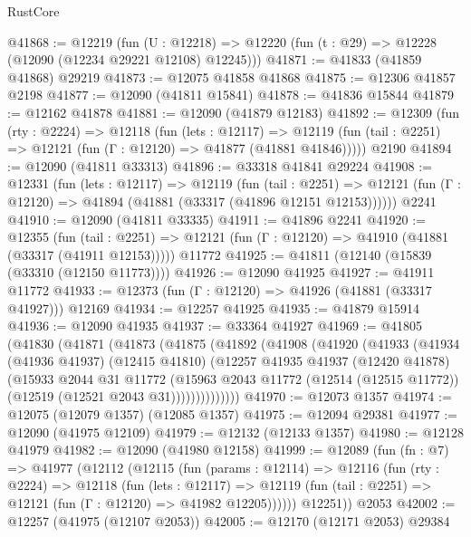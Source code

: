 \begin{lexlean}{RustCore}
\begin{coremodule}
@41868 := @12219
    (fun (U : @12218) => @12220 (fun (t : @29) => @12228 (@12090 (@12234 @29221 @12108) @12245)))
@41871 := @41833 (@41859 @41868) @29219
@41873 := @12075 @41858 @41868
@41875 := @12306 @41857 @2198
@41877 := @12090 (@41811 @15841)
@41878 := @41836 @15844
@41879 := @12162 @41878
@41881 := @12090 (@41879 @12183)
@41892 := @12309
    (fun (rty : @2224) =>
    @12118
      (fun (lets : @12117) =>
      @12119 (fun (tail : @2251) => @12121 (fun (Γ : @12120) => @41877 (@41881 @41846)))))
    @2190
@41894 := @12090 (@41811 @33313)
@41896 := @33318 @41841 @29224
@41908 := @12331
    (fun (lets : @12117) =>
    @12119
      (fun (tail : @2251) =>
      @12121 (fun (Γ : @12120) => @41894 (@41881 (@33317 (@41896 @12151 @12153))))))
    @2241
@41910 := @12090 (@41811 @33335)
@41911 := @41896 @2241
@41920 := @12355
    (fun (tail : @2251) => @12121 (fun (Γ : @12120) => @41910 (@41881 (@33317 (@41911 @12153)))))
    @11772
@41925 := @41811 (@12140 (@15839 (@33310 (@12150 @11773))))
@41926 := @12090 @41925
@41927 := @41911 @11772
@41933 := @12373 (fun (Γ : @12120) => @41926 (@41881 (@33317 @41927))) @12169
@41934 := @12257 @41925
@41935 := @41879 @15914
@41936 := @12090 @41935
@41937 := @33364 @41927
@41969 := @41805
    (@41830
      (@41871
        (@41873
          (@41875
            (@41892
              (@41908
                (@41920
                  (@41933
                    (@41934
                      (@41936 @41937)
                      (@12415 @41810)
                      (@12257
                        @41935
                        @41937
                        (@12420 @41878)
                        (@15933
                          @2044
                          @31
                          @11772
                          (@15963
                            @2043
                            @11772
                            (@12514 (@12515 @11772))
                            (@12519 (@12521 @2043 @31))))))))))))))
@41970 := @12073 @1357
@41974 := @12075 (@12079 @1357) (@12085 @1357)
@41975 := @12094 @29381
@41977 := @12090 (@41975 @12109)
@41979 := @12132 (@12133 @1357)
@41980 := @12128 @41979
@41982 := @12090 (@41980 @12158)
@41999 := @12089
    (fun (fn : @7) =>
    @41977
      (@12112
        (@12115
          (fun (params : @12114) =>
          @12116
            (fun (rty : @2224) =>
            @12118
              (fun (lets : @12117) =>
              @12119 (fun (tail : @2251) => @12121 (fun (Γ : @12120) => @41982 @12205))))))
        @12251))
    @2053
@42002 := @12257 (@41975 (@12107 @2053))
@42005 := @12170 (@12171 @2053) @29384

\end{coremodule}
\end{lexlean}
